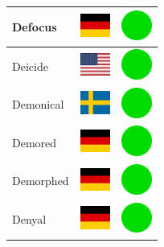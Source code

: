 \documentclass[12pt, a4paper, twoside]{report}
\begin{document}
\begin{center}
\begin{longtable}{|p{5cm}|p{2cm}|p{2cm}|}
 Defocus                                                    & \includegraphics[width=1cm]{4x3/de} &   \includegraphics[width=1cm]{likes/y} \\ \hline
 Deicide                                                    & \includegraphics[width=1cm]{4x3/us} &   \includegraphics[width=1cm]{likes/y} \\ \hline
 Demonical                                                  & \includegraphics[width=1cm]{4x3/se} &   \includegraphics[width=1cm]{likes/y} \\ \hline
 Demored                                                    & \includegraphics[width=1cm]{4x3/de} &   \includegraphics[width=1cm]{likes/y} \\ \hline
 Demorphed                                                  & \includegraphics[width=1cm]{4x3/de} &   \includegraphics[width=1cm]{likes/y} \\ \hline
 Denyal                                                     & \includegraphics[width=1cm]{4x3/de} &   \includegraphics[width=1cm]{likes/y} \\ \hline

\end{longtable}
\end{center}
\end{document}
